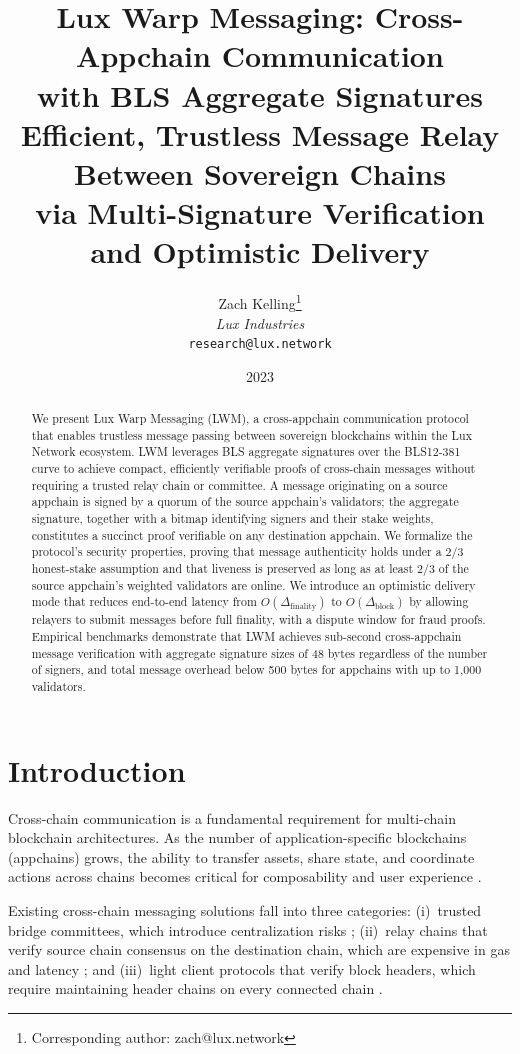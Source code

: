 \documentclass[11pt,a4paper]{article}
\title{\textbf{Lux Warp Messaging: Cross-Appchain Communication\\with BLS Aggregate Signatures}\\[6pt]
\large Efficient, Trustless Message Relay Between Sovereign Chains\\via Multi-Signature Verification and Optimistic Delivery}
\author{
Zach Kelling\thanks{Corresponding author: zach@lux.network}\\
\textit{Lux Industries}\\
\texttt{research@lux.network}
}
\date{2023}
\begin{document}
\luxcoverpage
\maketitle

\begin{abstract}
We present Lux Warp Messaging (LWM), a cross-appchain communication protocol that enables trustless message passing between sovereign blockchains within the Lux Network ecosystem. LWM leverages BLS aggregate signatures over the BLS12-381 curve to achieve compact, efficiently verifiable proofs of cross-chain messages without requiring a trusted relay chain or committee. A message originating on a source appchain is signed by a quorum of the source appchain's validators; the aggregate signature, together with a bitmap identifying signers and their stake weights, constitutes a succinct proof verifiable on any destination appchain. We formalize the protocol's security properties, proving that message authenticity holds under a $2/3$ honest-stake assumption and that liveness is preserved as long as at least $2/3$ of the source appchain's weighted validators are online. We introduce an optimistic delivery mode that reduces end-to-end latency from $O(\Delta_{\text{finality}})$ to $O(\Delta_{\text{block}})$ by allowing relayers to submit messages before full finality, with a dispute window for fraud proofs. Empirical benchmarks demonstrate that LWM achieves sub-second cross-appchain message verification with aggregate signature sizes of 48 bytes regardless of the number of signers, and total message overhead below 500 bytes for appchains with up to 1,000 validators.
\end{abstract}

\section{Introduction}

Cross-chain communication is a fundamental requirement for multi-chain blockchain architectures. As the number of application-specific blockchains (appchains) grows, the ability to transfer assets, share state, and coordinate actions across chains becomes critical for composability and user experience \cite{wood2016polkadot, kwon2016cosmos}.

Existing cross-chain messaging solutions fall into three categories: (i)~trusted bridge committees, which introduce centralization risks \cite{zamyatin2021bridge}; (ii)~relay chains that verify source chain consensus on the destination chain, which are expensive in gas and latency \cite{kwon2016cosmos}; and (iii)~light client protocols that verify block headers, which require maintaining header chains on every connected chain \cite{kiayias2016proofs}.
\end{document}
